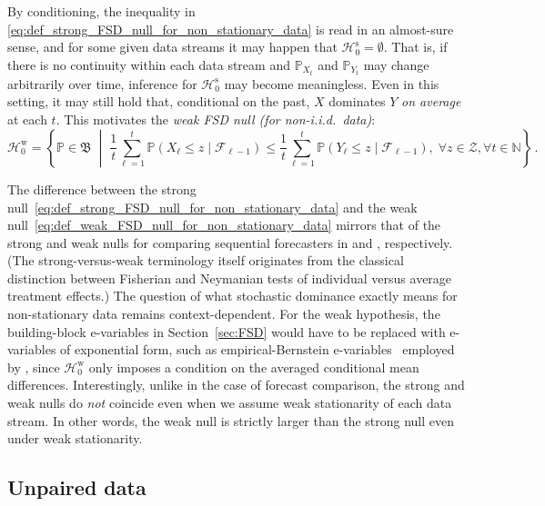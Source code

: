 \documentclass[12pt,twoside]{article}
\theoremstyle{plain}
\theoremstyle{definition}
\theoremstyle{remark}
\newcommand{\N}{\mathbb{N}}
\newcommand{\calF}{\mathcal{F}}
\newcommand{\calH}{\mathcal{H}}
\newcommand{\calZ}{\mathcal{Z}}
\newcommand{\Psymb}{\mathbb{P}}
\newcommand{\frakB}{\mathfrak{B}}
\begin{document}
By conditioning, the inequality in \eqref{eq:def_strong_FSD_null_for_non_stationary_data} is read in an almost-sure sense, and for some given data streams it may happen that $\calH_0^\textrm{s}=\emptyset$. 
That is, if there is no continuity within each data stream and $\Psymb_{X_t}$ and $\Psymb_{Y_t}$ may change arbitrarily over time, inference for $\calH_0^\textrm{s}$ may become meaningless. 
Even in this setting, it may still hold that, conditional on the past, $X$ dominates $Y$ \emph{on average} at each $t$. 
This motivates the \emph{weak FSD null (for non-i.i.d.~data)}:
\begin{equation}\label{eq:def_weak_FSD_null_for_non_stationary_data}
     \calH_0^\textrm{w} =\left\{
        \Psymb \in \frakB \;\middle|\; \frac{1}{t}\sum_{\ell=1}^t\Psymb(X_\ell\leq z\mid \calF_{\ell-1})\leq \frac{1}{t}\sum_{\ell=1}^t\Psymb(Y_\ell\leq z\mid \calF_{\ell-1}),\; \forall z\in \calZ, \forall t\in \N
    \right\}\,.
\end{equation}


The difference between the strong null~\eqref{eq:def_strong_FSD_null_for_non_stationary_data} and the weak null~\eqref{eq:def_weak_FSD_null_for_non_stationary_data} mirrors that of the strong and weak nulls for comparing sequential forecasters in \citet{henzi2022valid} and \citet{choe2023comparing}, respectively. 
(The strong-versus-weak terminology itself originates from the classical distinction between Fisherian and Neymanian tests of individual versus average treatment effects.)
The question of what stochastic dominance exactly means for non-stationary data remains context-dependent. 
For the weak hypothesis, the building-block e-variables in Section~\ref{sec:FSD} would have to be replaced with e-variables of exponential form, such as empirical-Bernstein e-variables~\citep{howard2021time} employed by \citet{mineiro2023nonstationarity}, since $\calH_0^\textrm{w}$ only imposes a condition on the averaged conditional mean differences. 
Interestingly, unlike in the case of forecast comparison, the strong and weak nulls do \emph{not} coincide even when we assume weak stationarity of each data stream. 
In other words, the weak null is strictly larger than the strong null even under weak stationarity. 


\subsection{Unpaired data}\label{sec:unpaired_data}
\end{document}
